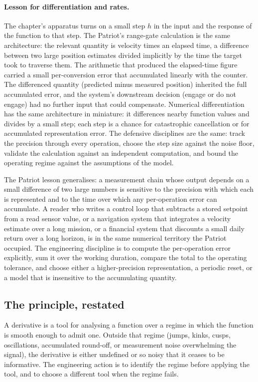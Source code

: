 \paragraph{Lesson for differentiation and rates.}
The chapter's apparatus turns on a small step $h$ in the input
and the response of the function to that step. The Patriot's
range-gate calculation is the same architecture: the relevant
quantity is velocity times an elapsed time, a difference between
two large position estimates divided implicitly by the time the
target took to traverse them. The arithmetic that produced the
elapsed-time figure carried a small per-conversion error that
accumulated linearly with the counter. The differenced quantity
(predicted minus measured position) inherited the full accumulated
error, and the system's downstream decision (engage or do not
engage) had no further input that could compensate. Numerical
differentiation has the same architecture in miniature: it
differences nearby function values and divides by a small step;
each step is a chance for catastrophic cancellation or for
accumulated representation error. The defensive disciplines are
the same: track the precision through every operation, choose the
step size against the noise floor, validate the calculation
against an independent computation, and bound the operating
regime against the assumptions of the model.

The Patriot lesson generalises: a measurement chain whose output
depends on a small difference of two large numbers is sensitive
to the precision with which each is represented and to the time
over which any per-operation error can accumulate. A reader who
writes a control loop that subtracts a stored setpoint from a
read sensor value, or a navigation system that integrates a
velocity estimate over a long mission, or a financial system that
discounts a small daily return over a long horizon, is in the
same numerical territory the Patriot occupied. The engineering
discipline is to compute the per-operation error explicitly, sum
it over the working duration, compare the total to the operating
tolerance, and choose either a higher-precision representation,
a periodic reset, or a model that is insensitive to the
accumulating quantity.

\subsection{The principle, restated}

\begin{principle}
A derivative is a tool for analysing a function over a regime in
which the function is smooth enough to admit one. Outside that
regime (jumps, kinks, cusps, oscillations, accumulated round-off,
or measurement noise overwhelming the signal), the derivative is
either undefined or so noisy that it ceases to be informative.
The engineering action is to identify the regime before applying
the tool, and to choose a different tool when the regime fails.
\end{principle}

